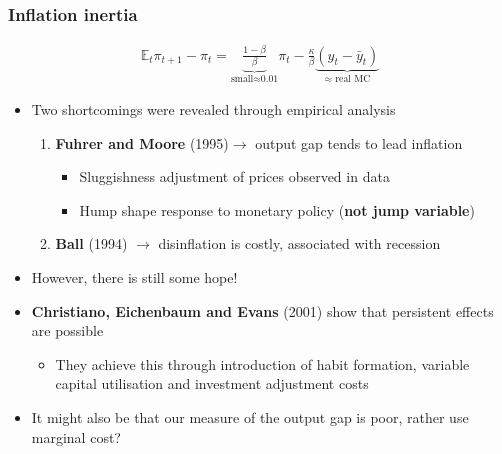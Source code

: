\documentclass[10pt, xcolor=x11names, table]{beamer}
\begin{document}
\begin{frame}
\frametitle{Inflation inertia}
\begin{align*}
\mathbb{E}_{t}\pi_{t+1} - \pi_{t} = \underbrace{\frac{1-\beta}{\beta}}_\text{small$\approx$0.01} \pi_{t} - \frac{\kappa}{\beta}\underbrace{(y_{t} - \bar{y}_{t})}_\text{$\approx$ real MC}
\end{align*}
\small
\begin{itemize}
  \item Two shortcomings were revealed through empirical analysis
  \begin{enumerate}
  \item \textbf{Fuhrer and Moore} (1995)$\rightarrow$ output gap tends to lead inflation
  \begin{itemize}
    \item Sluggishness adjustment of prices observed in data
    \item Hump shape response to monetary policy (\textbf{not jump variable})
  \end{itemize}
  \item \textbf{Ball} (1994) $\rightarrow$ disinflation is costly, associated with recession
  \end{enumerate}
\item However, there is still some hope!
\item \textbf{Christiano, Eichenbaum and Evans} (2001) show that persistent effects are possible
\begin{itemize}
  \item They achieve this through introduction of habit formation, variable capital utilisation and investment adjustment costs
\end{itemize}
\item It might also be that our measure of the output gap is poor, rather use marginal cost?
\end{itemize}
\end{frame}
\end{document}
